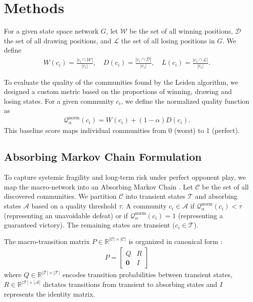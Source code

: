 \documentclass[9pt,twocolumn,twoside]{pnas-report}
\begin{document}
\section*{Methods}
For a given state space network $G$, let $\mathcal{W}$ be the set of all winning positions, $\mathcal{D}$ the set of all drawing positions, and $\mathcal{L}$ the set of all losing positions in $G$. We define
\begin{align*}
    W(c_i) = \frac{|c_i \cap \mathcal{W}|}{|c_i|}, \quad  D(c_i) = \frac{|c_i \cap \mathcal{D}|}{|c_i|}, \quad L(c_i) = \frac{|c_i \cap \mathcal{L}|}{|c_i|}.
\end{align*}

To evaluate the quality of the communities found by the Leiden algorithm, we designed a custom metric based on the proportions of winning, drawing and losing states. For a given community $c_i$, we define the normalized quality function as
\begin{align}
    \mathcal{Q}_\alpha^{\text{norm}}(c_i) = W(c_i) + (1 - \alpha)D(c_i).
    \label{Q_norm}
\end{align}
This baseline score maps individual communities from 0 (worst) to 1 (perfect).

\subsection*{Absorbing Markov Chain Formulation}
To capture systemic fragility and long-term risk under perfect opponent play, we map the macro-network into an Absorbing Markov Chain \cite{markov_chains}. Let $\mathcal{C}$ be the set of all discovered communities. We partition $\mathcal{C}$ into transient states $\mathcal{T}$ and absorbing states $\mathcal{A}$ based on a quality threshold $\tau$. A community $c_i \in \mathcal{A}$ if $\mathcal{Q}_\alpha^{\text{norm}}(c_i) < \tau$ (representing an unavoidable defeat) or if $\mathcal{Q}_\alpha^{\text{norm}}(c_i) = 1$ (representing a guaranteed victory). The remaining states are transient ($c_i \in \mathcal{T}$).

The macro-transition matrix $P \in \mathbb{R}^{|\mathcal{C}| \times |\mathcal{C}|}$ is organized in canonical form \cite{markov_chains}:
\begin{align}
    P = \begin{bmatrix} Q & R \\ \mathbf{0} & I \end{bmatrix}
    \label{P_matrix}
\end{align}
where $Q \in \mathbb{R}^{|\mathcal{T}| \times |\mathcal{T}|}$ encodes transition probabilities between transient states, $R \in \mathbb{R}^{|\mathcal{T}| \times |\mathcal{A}|}$ dictates transitions from transient to absorbing states and $I$ represents the identity matrix.
\end{document}
